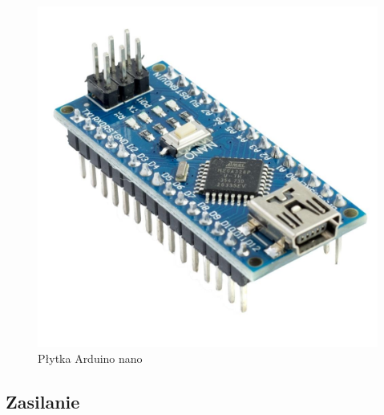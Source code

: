 \documentclass[polish,polish,a4paper]{article}
\begin{document}
\begin{figure}[!htb]
\begin{minipage}{0.3\textwidth}
       \end{minipage}\hfill
       \begin{minipage}{0.3\textwidth}
         \centering
         \includegraphics[width=1\linewidth]{photo/arduino.jpg}
         \caption{Płytka Arduino nano}\label{Fig:Data2}
       \end{minipage}
        \end{figure}
       
\newpage
    \subsection{Zasilanie}  
\end{document}
